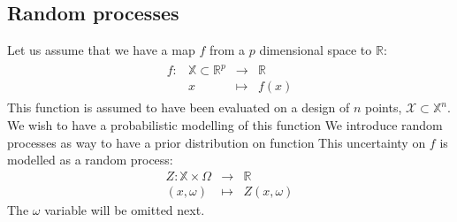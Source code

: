 \documentclass[a4paper,11pt]{article}
\begin{document}
\subsection{Random processes}
Let us assume that we have a map $f$ from a $p$ dimensional space to $\mathbb{R}$:
\begin{align}
  \begin{array}{rrcl}
    f: & \mathbb{X} \subset \mathbb{R}^p& \longrightarrow & \mathbb{R} \\
       & x & \longmapsto & f(x)
  \end{array}
\end{align}
This function is assumed to have been evaluated on a design of $n$ points, $\mathcal{X} \subset \mathbb{X}^n$. 
We wish to have a probabilistic modelling of this function
We introduce random processes as way to have a prior distribution on function
This uncertainty on $f$ is modelled as a random process:
\begin{equation}
  \begin{array}{rcl}
    Z: \mathbb{X} \times \Omega& \longrightarrow & \mathbb{R} \\
    (x,\omega) & \longmapsto & Z(x,\omega)
  \end{array}
\end{equation}
The $\omega$ variable will be omitted next.
\end{document}
